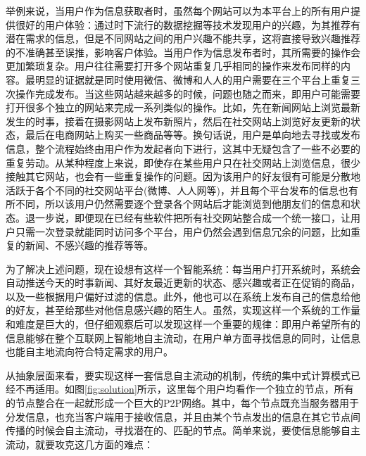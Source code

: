 举例来说，当用户作为信息获取者时，虽然每个网站可以为本平台上的所有用户提供很好的用户体验：通过时下流行的数据挖掘等技术发现用户的兴趣，为其推荐有潜在需求的信息，但是不同网站之间的用户兴趣不能共享，这将直接导致兴趣推荐的不准确甚至误推，影响客户体验。当用户作为信息发布者时，其所需要的操作会更加繁琐复杂。用户往往需要打开多个网站重复几乎相同的操作来发布同样的内容。最明显的证据就是同时使用微信、微博和人人的用户需要在三个平台上重复三次操作完成发布。当这些网站越来越多的时候，问题也随之而来，即用户可能需要打开很多个独立的网站来完成一系列类似的操作。比如，先在新闻网站上浏览最新发生的时事，接着在摄影网站上发布新照片，然后在社交网站上浏览好友更新的状态，最后在电商网站上购买一些商品等等。换句话说，用户是单向地去寻找或发布信息，整个流程始终由用户作为发起者向下进行，这其中无疑包含了一些不必要的重复劳动。从某种程度上来说，即使存在某些用户只在社交网站上浏览信息，很少接触其它网站，也会有一些重复操作的问题。因为该用户的好友很有可能是分散地活跃于各个不同的社交网站平台(微博、人人网等)，并且每个平台发布的信息也有所不同，所以该用户仍然需要逐个登录各个网站后才能浏览到他朋友们的信息和状态。退一步说，即便现在已经有些软件把所有社交网站整合成一个统一接口，让用户只需一次登录就能同时访问多个平台，用户仍然会遇到信息冗余的问题，比如重复的新闻、不感兴趣的推荐等等。

为了解决上述问题，现在设想有这样一个智能系统：每当用户打开系统时，系统会自动推送今天的时事新闻、其好友最近更新的状态、感兴趣或者正在促销的商品，以及一些根据用户偏好过滤的信息。此外，他也可以在系统上发布自己的信息给他的好友，甚至给那些对他信息感兴趣的陌生人。虽然，实现这样一个系统的工作量和难度是巨大的，但仔细观察后可以发现这样一个重要的规律：即用户希望所有的信息能够在整个互联网上智能地自主流动，在用户单方面寻找信息的同时，让信息也能自主地流向符合特定需求的用户。

从抽象层面来看，要实现这样一套信息自主流动的机制，传统的集中式计算模式已经不再适用。如图\ref{fig:solution}所示，这里每个用户均看作一个独立的节点，所有的节点整合在一起就形成一个巨大的P2P网络。其中，每个节点既充当服务器用于分发信息，也充当客户端用于接收信息，并且由某个节点发出的信息在其它节点间传播的时候会自主流动，寻找潜在的、匹配的节点。简单来说，要使信息能够自主流动，就要攻克这几方面的难点：

